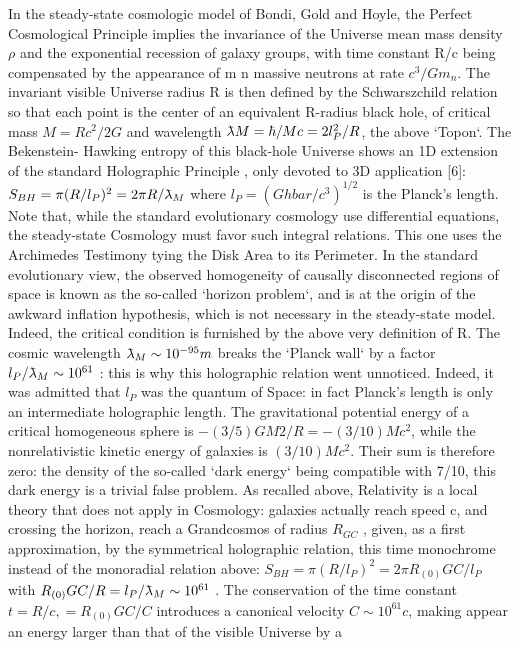 In the steady-state cosmologic model of Bondi, Gold and Hoyle, the Perfect Cosmological
Principle implies the invariance of the Universe mean mass density $\rho$ and the exponential recession
of galaxy groups, with time constant R/c being compensated by the appearance of m n massive
neutrons at rate $c^{3} /Gm_{n}$. The invariant visible Universe radius R is then defined by the
Schwarszchild relation so that each point is the center of an equivalent R-radius black hole, of
critical mass $M = Rc^{2} /2G$ and wavelength $\lambdabar M = \hbar/Mc = 2l_{P}^{2} /R$, the above `Topon`. The Bekenstein-
Hawking entropy of this black-hole Universe shows an 1D extension of the standard Holographic
Principle , only devoted to 3D application [6]:
$S_{BH} = \pi(R/l_{P})^{2} = 2\pi R/\lambdabar_{M}$
where $l_{P} = (Ghbar/c^3 )^{1/2}$ is the Planck's length. Note that, while the standard evolutionary cosmology
use differential equations, the steady-state Cosmology must favor such integral relations. This one
uses the Archimedes Testimony tying the Disk Area to its Perimeter.
In the standard evolutionary view, the observed homogeneity of causally disconnected regions
of space is known as the so-called `horizon problem`, and is at the origin of the awkward inflation
hypothesis, which is not necessary in the steady-state model. Indeed, the critical condition is
furnished by the above very definition of R.
The cosmic wavelength $\lambdabar_M \sim 10^{-95} m$ breaks the `Planck wall` by a factor $l_{P} /\lambdabar_{M} \sim 10^{61}$ : this is why this holographic relation went unnoticed. Indeed, it was admitted that $l_{P}$ was the quantum of Space: in fact Planck's length is only an intermediate holographic length.
The gravitational potential energy of a critical homogeneous sphere is $-(3/5)GM2/R = -
(3/10)Mc^{2}$, while the nonrelativistic kinetic energy of galaxies is $(3/10)Mc^{2}$. Their sum is therefore
zero: the density of the so-called `dark energy` being compatible with 7/10, this dark energy is a
trivial false problem. As recalled above, Relativity is a local theory that does not apply in
Cosmology: galaxies actually reach speed c, and crossing the horizon, reach a Grandcosmos of
radius $R_{GC}$ , given, as a first approximation, by the symmetrical holographic relation, this time
monochrome instead of the monoradial relation above:
$S_{BH} = \pi(R/l_P )^{2} = 2\pi R_{(0)} GC /l_{P}$
with $R_{(0)} GC /R = l_{P} /\lambdabar_{M} \sim 10^{61}$ . The conservation of the time constant $t = R/c, = R_{(0)} GC /C$ introduces a canonical velocity $C \sim 10^{61} c$, making appear an energy larger than that of the visible Universe by a
